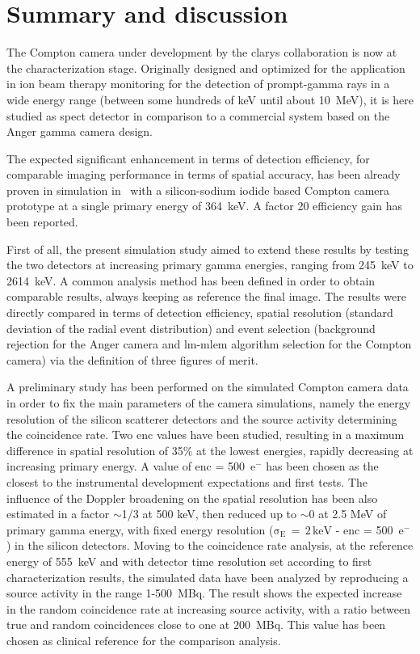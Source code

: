 \section{Summary and discussion}\label{chap5::sec::Conclusions}

The Compton camera under development by the \gls{clarys} collaboration is now at the characterization stage. Originally designed and optimized for the application in ion beam therapy monitoring  for the detection of prompt-gamma rays in a wide energy range (between some hundreds of keV until about 10~MeV), it is here studied as \gls{spect} detector in comparison to a commercial system based on the Anger gamma camera design.

The expected significant enhancement in terms of detection efficiency, for comparable imaging performance in terms of spatial accuracy, has been already proven in simulation in~\parencite{Han2008} with a silicon-sodium iodide based Compton camera prototype at a single primary energy of 364~keV. A factor 20 efficiency gain has been reported.

First of all, the present simulation study aimed to extend these results by testing the two detectors at increasing primary gamma energies, ranging from 245~keV to 2614~keV. A common analysis method has been defined in order to obtain comparable results, always keeping as reference the final image. The results were directly compared in terms of  detection efficiency, spatial resolution (standard deviation of the radial event distribution) and event selection (background rejection for the Anger camera and \gls{lm-mlem} algorithm selection for the Compton camera) via the definition of three figures of merit.

A preliminary study has been performed on the simulated Compton camera data in order to fix the main parameters of the camera simulations, namely the energy resolution of the silicon scatterer detectors and the source activity determining the coincidence rate. Two \gls{enc} values have been studied, resulting in a maximum difference in spatial resolution of 35\% at the lowest energies, rapidly decreasing at increasing primary energy. A value of \gls{enc} = 500~e$^-$ has been chosen as the closest to the instrumental development expectations and first tests. The influence of the Doppler broadening on the spatial resolution has been also estimated in a factor $\sim$1/3 at 500 keV, then reduced up to $\sim$0 at 2.5 MeV of primary gamma energy, with fixed energy resolution ($\mathrm{\sigma_{E}\,=\,2\,keV}$ - \gls{enc} = 500~e$^-$) in the silicon detectors. Moving to the coincidence rate analysis, at the reference energy of 555~keV and with detector time resolution set according to first characterization results, the simulated data have been analyzed by reproducing a source activity in the range 1-500~MBq. The result shows the expected increase in the random coincidence rate at increasing source activity, with a ratio between true and random coincidences close to one at 200~MBq. This value has been chosen as clinical reference for the comparison analysis.

